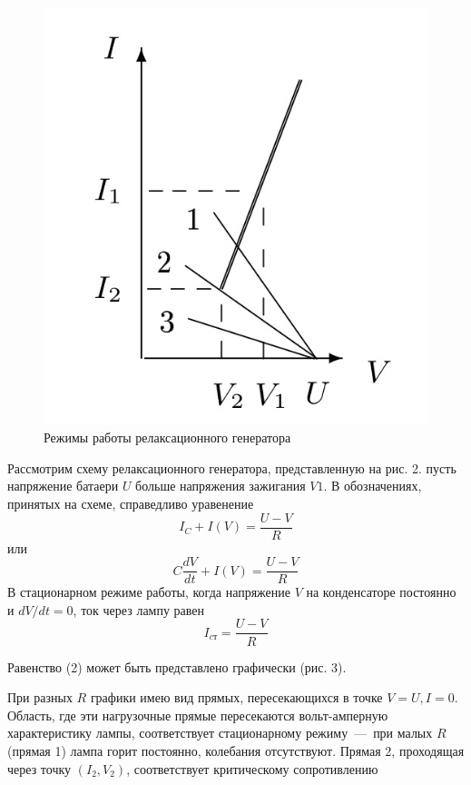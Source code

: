 \documentclass[a4paper, 12pt]{article}
\begin{document}
    \begin{figure}
        \includegraphics[scale=0.2]{pic3.jpg}
        \caption{Режимы работы релаксационного генератора}
    \end{figure}

    Рассмотрим схему релаксационного генератора, представленную на рис. 2. пусть напряжение батаери $U$ больше напряжения зажигания $V1$. В обозначениях, принятых на схеме, справедливо уравенение
    \begin{equation*}
        I_C + I\left(V\right) = \dfrac{U - V}{R}
    \end{equation*}
    или
    \begin{equation}
        C\dfrac{dV}{dt} + I\left(V\right) = \dfrac{U - V}{R}
    \end{equation}
    В стационарном режиме работы, когда напряжение $V$ на конденсаторе постоянно и $dV/dt = 0$, ток через лампу равен
    \begin{equation}
        I_{cт}=\dfrac{U - V}{R}
    \end{equation}

    Равенство (2) может быть представлено графически (рис. 3).

    При разных $R$ графики имею вид прямых, пересекающихся в точке $V = U, I = 0$.
    Область, где эти нагрузочные прямые пересекаются вольт-амперную характеристику лампы, соответствует стационарному режиму~---~при малых $R$ (прямая 1) лампа горит постоянно, колебания отсутствуют.
    Прямая 2, проходящая через точку $\left(I_2, V_2\right)$, соответствует критическому сопротивлению
\end{document}
